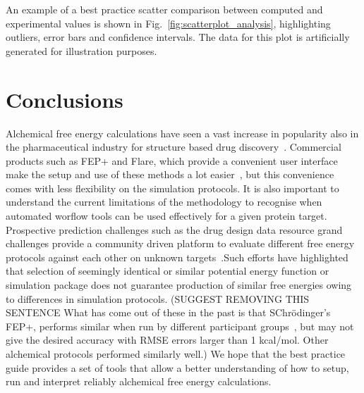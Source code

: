 \documentclass[9pt,bestpractices]{livecoms}
\begin{document}
An example of a best practice scatter comparison between computed and experimental values is shown in Fig.~\ref{fig:scatterplot_analysis}, highlighting outliers, error bars and confidence intervals. The data for this plot is artificially generated for illustration purposes.
\section{Conclusions}
\label{sec:conclusion}
Alchemical free energy calculations have seen a vast increase in popularity also in the pharmaceutical industry for structure based drug discovery~\cite{schindler2020largescale, sherborne2016collaborating, wagner2017computational}. Commercial products such as FEP+ and Flare, which provide a convenient user interface make the setup and use of these methods a lot easier~\cite{wang2015accurate}, but this convenience comes with less flexibility on the simulation protocols. It is also important to understand the current limitations of the methodology to recognise when automated worflow tools can be used effectively for a given protein target. Prospective prediction challenges such as the drug design data resource grand challenges provide a community driven platform to evaluate different free energy protocols against each other on unknown targets~\cite{gaieb2018d3r, gaieb2019d3r}.Such efforts have highlighted that selection of seemingly identical or similar potential energy function or simulation package does not guarantee production of similar free energies owing to differences in simulation protocols. 
(SUGGEST REMOVING THIS SENTENCE What has come out of these in the past is that SChrödinger's FEP+, performs similar when run by different participant groups~\cite{gaieb2018d3r}, but may not give the desired accuracy with RMSE errors larger than 1 kcal/mol. Other alchemical protocols performed similarly well.) We hope that the best practice guide provides a set of tools that allow a better understanding of how to setup, run and interpret reliably alchemical free energy calculations. 
%
\end{document}

